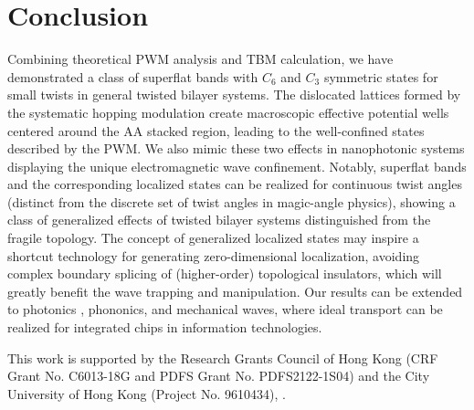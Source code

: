 \documentclass[%
reprint,
amsmath,amssymb,amsfonts
aps,
superscriptaddress,
prx
]{revtex4-1}
\begin{document}
\section{Conclusion} 
Combining theoretical PWM analysis and TBM calculation, we have demonstrated a class of superflat bands with $C_6$ and $C_3$ symmetric states for small twists in general twisted bilayer systems. 
The dislocated lattices formed by the systematic hopping modulation create macroscopic effective potential wells centered around the AA stacked region, leading to the well-confined states described by the PWM. 
We also mimic these two effects in nanophotonic systems displaying the unique electromagnetic wave confinement.
Notably, superflat bands and the corresponding localized states can be realized for continuous twist angles (distinct from the discrete set of twist angles in magic-angle physics), showing a class of generalized effects of twisted bilayer systems distinguished from the fragile topology. 
The concept of generalized localized states may inspire a shortcut technology for generating zero-dimensional localization, avoiding complex boundary splicing of (higher-order) topological insulators, which will greatly benefit the wave trapping and manipulation. 
Our results can be extended to photonics \cite{bilayer1_photonic,bilayer2_photonic}, phononics, and mechanical waves, where ideal transport can be realized for integrated chips in information technologies.
 
\begin{acknowledgments}
This work is supported by the Research Grants Council of Hong Kong (CRF Grant No. C6013-18G and PDFS Grant No. PDFS2122-1S04) and the City University of Hong Kong (Project No. 9610434), .
\end{acknowledgments}



\end{document}
